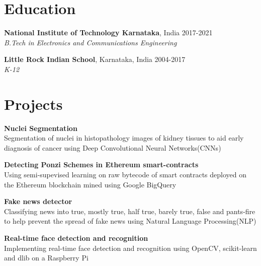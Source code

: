 \documentclass[margin]{res}
\begin{document}
  \address{National Institute of Technology\\
           Karnataka, India\\
           \href{https://linkedin.com/in/rshwndsz}{linkedin.com/in/rshwndsz}}
  \address{(91+) 9611212081\\
           russel.171ec143@nitk.edu.in\\
           \href{https://github.com/rshwndsz}{github.com/rshwndsz}}

  \begin{resume}
    \section{Education}
      \textbf{National Institute of Technology Karnataka}, India\hfill
      2017-2021 \\
      {\sl B.Tech in Electronics and Communications Engineering}\hfill

      \textbf{Little Rock Indian School}, Karnataka, India\hfill
      2004-2017 \\
      {\sl K-12}\hfill

    \section{Projects}
      \par
      \textbf{Nuclei Segmentation}\\
      Segmentation of nuclei in histopathology images of kidney tissues to aid early diagnosis of cancer using Deep Convolutional Neural Networks(CNNs)

      \par
      \textbf{Detecting Ponzi Schemes in Ethereum smart-contracts}\\
      Using semi-supevised learning on raw bytecode of smart contracts deployed on the Ethereum blockchain mined using Google BigQuery

      \par
      \textbf{Fake news detector}\\
      Classifying news into true, mostly true, half true, barely true, false and pants-fire to help prevent the spread of fake news using Natural Language Processing(NLP)

      \par
      \textbf{Real-time face detection and recognition}\\
      Implementing real-time face detection and recognition using OpenCV, scikit-learn and dlib on a Raspberry Pi


\end{resume}
\end{document}
